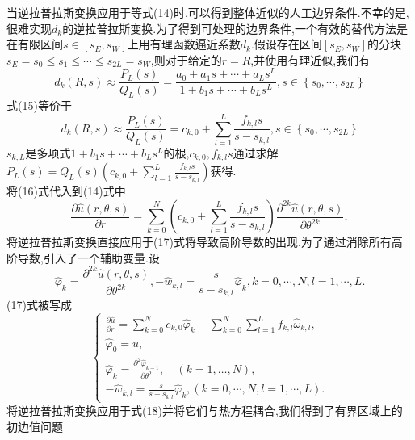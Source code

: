 \documentclass[a4paper,15pt,twoside,zihao=-4]{article}
\begin{document}
\indent 当逆拉普拉斯变换应用于等式(14)时,可以得到整体近似的人工边界条件.不幸的是,很难实现$d_k$的逆拉普拉斯变换.为了得到可处理的边界条件,一个有效的替代方法是在有限区间$s\in[s_E,s_W]$上用有理函数逼近系数$d_k$.假设存在区间$[s_E,s_W]$的分块$s_E = s_0\le s_1\le\cdots \le s_{2L} = s_W$,则对于给定的$r = R$,并使用有理近似,我们有
\begin{equation}
d_k(R,s)\approx \frac{P_L(s)}{Q_L(s)}=\frac{a_0+a_1s+\cdots+a_Ls^L}{1+b_1s+\cdots+b_Ls^L},
s\in\left \{ s_0,\cdots ,s_{2L} \right \}
\end{equation}
\indent 式(15)等价于
\begin{equation}
d_k(R,s)\approx \frac{P_L(s)}{Q_L(s)}=c_{k,0}+\sum_{l=1}^{L}\frac{f_{k,l}s}{s-s_{k,l}},
s\in\left \{ s_0,\cdots ,s_{2L} \right \}
\end{equation}
$s_{k,L}$是多项式$1+b_1s+\cdots+b_Ls^L$的根,$c_{k,0},f_{k,l}s$通过求解$P_L(s)=Q_L(s)(c_{k,0}+\sum_{l=1}^{L}\frac{f_{k,l}s}{s-s_{k,l}})$获得.\\
\indent 将(16)式代入到(14)式中
\begin{equation}
\frac{\partial \hat{u}(r,\theta,s)}{\partial r}=
\sum_{k=0}^{N}\left ( c_{k,0}+\sum_{l=1}^{L}\frac{f_{k,l}s}{s-s_{k,l}} \right )
\frac{\partial^{2k} \hat{u}(r,\theta,s)}{\partial \theta^{2k}},
\end{equation}
\indent 将逆拉普拉斯变换直接应用于(17)式将导致高阶导数的出现.为了通过消除所有高阶导数,引入了一个辅助变量.设
$$\hat{\varphi}_k=\frac{\partial^{2k} \hat{u}(r,\theta,s)}{\partial \theta^{2k}}
,-\hat{w}_{k,l}=\frac{s}{s-s_{k,l}}\hat{\varphi}_k,k=0,\cdots,N,l=1,\cdots ,L .$$
\indent (17)式被写成
\begin{equation}
\left\{\begin{array}{l}
\displaystyle\frac{\partial \hat{u}}{\partial r}=\sum_{k=0}^{N} c_{k, 0} \hat{\varphi}_{k}-\sum_{k=0}^{N} \sum_{l=1}^{L} f_{k, l} \hat{\omega}_{k, l}, \\
\hat{\varphi}_{0}=u, \\
\displaystyle\hat{\varphi}_{k}=\frac{\partial^{2} \hat{\varphi}_{k-1}}{\partial \theta^{2}}, \quad(k=1, \ldots, N), \\
\displaystyle-\hat{w}_{k,l}=\frac{s}{s-s_{k,l}}\hat{\varphi}_k,\left (k=0,\cdots,N,l=1,\cdots ,L\right )  .
\end{array}\right.
\end{equation}
\indent 将逆拉普拉斯变换应用于式(18)并将它们与热方程耦合,我们得到了有界区域上的初边值问题
\end{document}
